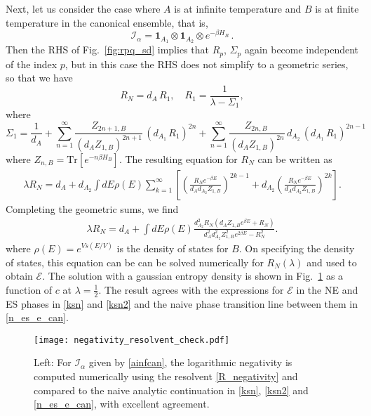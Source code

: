 \documentclass[a4paper,11pt]{article}
\newcommand{\SV}[1]{\textcolor{red}{#1}}
\newcommand\half{{\ensuremath{\frac{1}{2}}}}
\newcommand{\be}{\begin{equation}}
\newcommand{\ee}{\end{equation}}
\newcommand\al{{\alpha}}
\newcommand\ha{{\half}}
\newcommand\sE{{\ensuremath{{\mathcal E}}}}
\newcommand\sI{{\ensuremath{{\mathcal I}}}}
\begin{document}
\begin{enumerate}
\begin{appendix}
Next, let us consider the case where $A$ is at infinite temperature and $B$ is at finite temperature in the canonical ensemble, 
that is, 
\be 
\sI_{\al} = \mathbf{1}_{A_1} \otimes \mathbf{1}_{A_2} \otimes e^{-\beta H_B} \, . \label{ainfcan} 
\ee
Then the RHS of Fig.~\ref{fig:rpq_sd} implies that $R_p$, $\Sigma_p$ again become independent of the index $p$, but in this case the RHS does not simplify to a geometric series, so that we have 
\be 
R_N = d_A\, R_1, \quad R_1 = \frac{1}{\lambda - \Sigma_1}, 
\ee
where 
\be 
\Sigma_1 = \frac{1}{d_A} +\sum_{n=1}^{\infty} \frac{Z_{2n+1, B}}{(d_A Z_{1,B})^{2n+1}} \, (d_{A_1} \, R_1)^{2n} + \sum_{n=1}^{\infty} \frac{Z_{2n, B}\, }{(d_A Z_{1,B})^{2n}} \, d_{A_2} \, (d_{A_1} \, R_1)^{2n-1} 
\ee
where $Z_{n, B} = \text{Tr}[e^{-n \beta H_B }]$. 
The resulting equation for $R_N$ can be written as 
\begin{align}
 \lambda R_N = d_A + d_{A_2}\int dE \rho(E) \sum_{k = 1}^{\infty} \left[\left(\frac{R_Ne^{-\beta E}}{d_A d_{A_2}Z_{1,B}} \right)^{2k-1}+ d_{A_2} \left(\frac{R_Ne^{-\beta E}}{d_A d_{A_2}Z_{1,B}} \right)^{2k}\right].
\end{align}
Completing the geometric sums, we find
\begin{align}
 \lambda R_N = d_A + \int dE \rho(E)\frac{d_{A_2}^2 R_N \left(d_{A} Z_{1,B} e^{\beta E}+R_N\right)}{d_{A}^2
 d_{A_2}^2 Z_{1,B}^2 e^{2 \beta E}-R_N^2}.
 \label{R_negativity}
\end{align}
where $\rho(E) = e^{V s(E/V)}$ is the density of states for $B$. On specifying the density of states, this equation can be can be solved numerically for $R_N(\lambda)$ and used to obtain $\sE$. The solution with a gaussian entropy density is shown in Fig.~\ref{fig:resolvent_checks} as a function of $c$ at $\lambda = \ha$. The result agrees with the expressions for $\sE$ in the NE and ES phases in \eqref{ksn} and \eqref{ksn2} and the naive phase transition line between them in \eqref{n_es_e_can}. 

\begin{figure}[!h] 
\centering 
\texttt{[image: negativity\_resolvent\_check.pdf]}
\caption{Left: For $\sI_{\al}$ given by \eqref{ainfcan}, the logarithmic negativity is computed numerically using the resolvent \eqref{R_negativity} and compared to the naive analytic continuation in \eqref{ksn}, \eqref{ksn2} and \eqref{n_es_e_can}, with excellent agreement. 
}
\label{fig:resolvent_checks}
\end{figure}



\end{appendix}
\end{enumerate}
\end{document}
